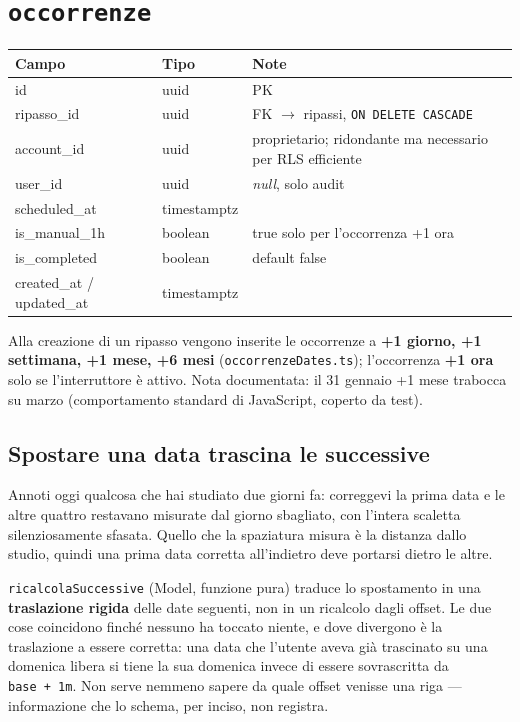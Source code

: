 \documentclass[11pt,a4paper]{report}
\begin{document}
\section{\texttt{occorrenze}}
\begin{center}
\begin{tabular}{@{}llp{8.6cm}@{}}
\toprule
\textbf{Campo} & \textbf{Tipo} & \textbf{Note} \\
\midrule
id & uuid & PK \\
ripasso\_id & uuid & FK $\rightarrow$ ripassi, \texttt{ON DELETE CASCADE} \\
account\_id & uuid & proprietario; ridondante ma necessario per RLS efficiente \\
user\_id & uuid & \textit{null}, solo audit \\
scheduled\_at & timestamptz & \\
is\_manual\_1h & boolean & true solo per l'occorrenza +1 ora \\
is\_completed & boolean & default false \\
created\_at / updated\_at & timestamptz & \\
\bottomrule
\end{tabular}
\end{center}

Alla creazione di un ripasso vengono inserite le occorrenze a
\textbf{+1 giorno, +1 settimana, +1 mese, +6 mesi} (\texttt{occorrenzeDates.ts});
l'occorrenza \textbf{+1 ora} solo se l'interruttore \`e attivo. Nota
documentata: il 31 gennaio +1 mese trabocca su marzo (comportamento standard
di JavaScript, coperto da test).

\subsection*{Spostare una data trascina le successive}

Annoti oggi qualcosa che hai studiato due giorni fa: correggevi la prima data e
le altre quattro restavano misurate dal giorno sbagliato, con l'intera scaletta
silenziosamente sfasata. Quello che la spaziatura misura \`e la distanza dallo
studio, quindi una prima data corretta all'indietro deve portarsi dietro le
altre.

\texttt{ricalcolaSuccessive} (Model, funzione pura) traduce lo spostamento in
una \textbf{traslazione rigida} delle date seguenti, non in un ricalcolo dagli
offset. Le due cose coincidono finch\'e nessuno ha toccato niente, e dove
divergono \`e la traslazione a essere corretta: una data che l'utente aveva
gi\`a trascinato su una domenica libera si tiene la sua domenica invece di
essere sovrascritta da \texttt{base~+~1m}. Non serve nemmeno sapere da quale
offset venisse una riga --- informazione che lo schema, per inciso, non
registra.
\end{document}
